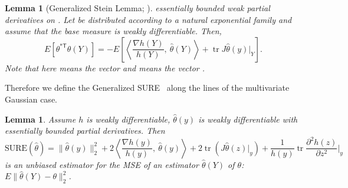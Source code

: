 \documentclass[ejs,noshowframe]{imsart}
\theoremstyle{plain}
\newtheorem{lemma}[theorem]{Lemma}
\theoremstyle{definition}
\newcommand{\snorm}[1]{\lVert #1 \rVert}
\newcommand{\R}{\mathbb{R}}
\newcommand{\E}{E}
\newcommand{\Expect}[1]{\E\left[#1\right]}
\renewcommand{\hat}{\widehat}
\renewcommand{\top}{\mathsf{T}}
\DeclareMathOperator*{\trace}{tr}
\begin{document}
\begin{appendix}
\begin{lemma}[Generalized Stein Lemma; \citealp{Eldar2009}]
	essentially
	bounded weak partial derivatives on \smash{$\R^n$}. Let  be 
	distributed
	according to a natural exponential family
	and assume that the base measure  is weakly differentiable. Then,
	\begin{equation}
		\label{eq:12}
		\Expect{\theta^{*\top} \hat\theta(Y)} = - \Expect{
			\left\langle\frac{\nabla h(Y)}{h(Y)},\ \hat\theta(Y)\right\rangle
			+ \trace J\hat\theta(y) \big\vert_Y}.
	\end{equation}
	Note that  here means the vector \smash{$[d/dy\ h(y)
	\vert_{y_i}]$} and  means the vector \smash{$[h(y_i)]$}.
\end{lemma}

Therefore we define the Generalized SURE~\citep{Eldar2009} along the lines of
the multivariate Gaussian case. 
\begin{lemma}
	  \label{lem:gsure}
	  Assume $h$ is weakly differentiable, 
	  $\hat\theta(y)$ is weakly differentiable with essentially bounded partial
	  derivatives. Then
	  \begin{equation}
		    \label{eq:13}
		    \mathrm{SURE}(\hat\theta) = \snorm{\hat\theta(y)}^2_2 +
        2 \left\langle\frac{\nabla
            h(y)}{h(y)},\ \hat\theta(y)\right\rangle + 2\trace\left( 
          J\hat\theta(z) \bigg\vert_y\right) + 
		    \frac{1}{h(y)} \trace \frac{\partial^2 h(z)}{\partial z^2}\bigg\vert_y
		  \end{equation}
	  is an unbiased estimator for the MSE of an estimator $\hat\theta(Y)$ of
	  $\theta$: $E\snorm{\hat\theta(Y) - \theta}_2^2$.
	\end{lemma}


\end{appendix}
\end{document}
